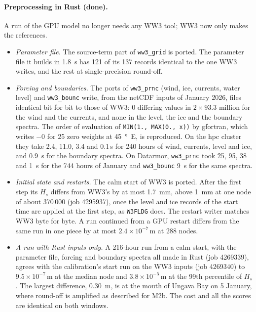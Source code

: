 \documentclass[11pt,a4paper]{article}
\begin{document}
\paragraph{Preprocessing in Rust (done).} A run of the GPU model no
longer needs any WW3 tool; WW3 now only makes the references.
\begin{itemize}
\item \emph{Parameter file.} The source-term part of \texttt{ww3\_grid}
is ported. The parameter file it builds in \SI{1.8}{s} has 121 of its 137
records identical to the one WW3 writes, and the rest at single-precision
round-off.
\item \emph{Forcing and boundaries.} The ports of \texttt{ww3\_prnc}
(wind, ice, currents, water level) and \texttt{ww3\_bounc} write, from
the netCDF inputs of January 2026, files identical bit for bit to those of
WW3: 0 differing values in $2\times93.3$ million for the wind and the
currents, and none in the level, the ice and the boundary spectra. The
order of evaluation of \texttt{MIN(1., MAX(0., x))} by gfortran, which
writes $-0$ for 25 zero weights at \SI{45}{\degree E}, is reproduced. On
the hpc cluster they take 2.4, 11.0, 3.4 and 0.1\,s for 240 hours of
wind, currents, level and ice, and \SI{0.9}{s} for the boundary spectra.
On Datarmor, \texttt{ww3\_prnc} took 25, 95, 38 and \SI{1}{s} for the
744 hours of January and \texttt{ww3\_bounc} \SI{9}{s} for the same
spectra.
\item \emph{Initial state and restarts.} The calm start of WW3 is
ported. After the first step its $H_s$ differs from WW3's by at most
\SI{1.7}{mm}, above \SI{1}{mm} at one node of about 370\,000 (job
4295937), once the level and ice records of the start time are applied
at the first step, as \texttt{W3FLDG} does. The restart writer matches
WW3 byte for byte. A run continued from a GPU restart differs from the
same run in one piece by at most $2.4\times10^{-7}$\,m at 288 nodes.
\item \emph{A run with Rust inputs only.} A 216-hour run from a calm
start, with the parameter file, forcing and boundary spectra all made in
Rust (job 4269339), agrees with the calibration's start run on the WW3
inputs (job 4269340) to $9.5\times10^{-7}$\,m at the median node and
$3.8\times10^{-5}$\,m at the 99th percentile of $H_s$. The largest
difference, \SI{0.30}{m}, is at the mouth of Ungava Bay on 5 January,
where round-off is amplified as described for M2b. The cost and all the
scores are identical on both windows.
\end{itemize}
\end{document}
